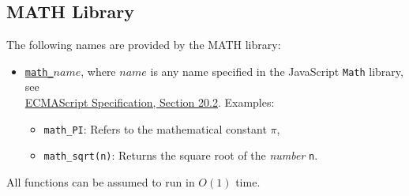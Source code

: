 \subsection*{MATH Library}


The following names are provided by the MATH library:
\begin{itemize}
\item \href{https://source-academy.github.io/sicp/chapters/1.1.4.html\#p8}{\lstinline{math_}$\textit{name}$},
where $\textit{name}$ is any name specified in the
JavaScript
\texttt{Math} library, see\\
\href{https://www.ecma-international.org/ecma-262/9.0/index.html\#sec-math-object}{\color{DarkBlue}ECMAScript Specification, Section 20.2}. Examples:
\begin{itemize}
\item \verb#math_PI#: Refers to the mathematical constant $\pi$,
\item \verb#math_sqrt#\texttt{(n)}: Returns the square root of the \emph{number} \texttt{n}.
\end{itemize}
\end{itemize}
All functions can be assumed to run
in $O(1)$ time.
